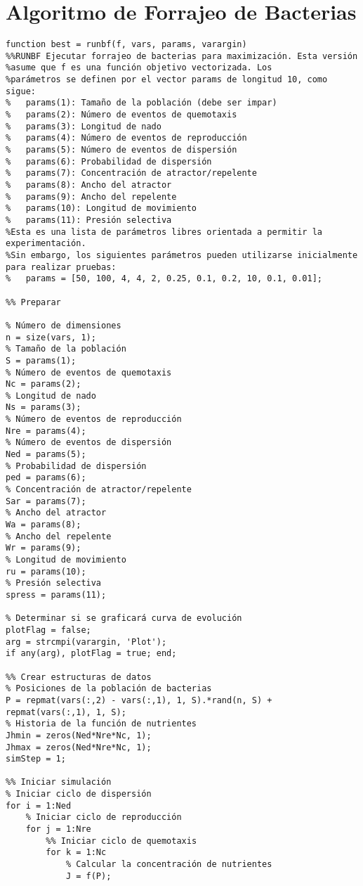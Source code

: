 \section{Algoritmo de Forrajeo de Bacterias}
\begin{scriptsize}
\begin{verbatim}
function best = runbf(f, vars, params, varargin)
%%RUNBF Ejecutar forrajeo de bacterias para maximización. Esta versión 
%asume que f es una función objetivo vectorizada. Los
%parámetros se definen por el vector params de longitud 10, como sigue:
%   params(1): Tamaño de la población (debe ser impar)
%   params(2): Número de eventos de quemotaxis
%   params(3): Longitud de nado
%   params(4): Número de eventos de reproducción
%   params(5): Número de eventos de dispersión
%   params(6): Probabilidad de dispersión
%   params(7): Concentración de atractor/repelente
%   params(8): Ancho del atractor
%   params(9): Ancho del repelente
%   params(10): Longitud de movimiento
%   params(11): Presión selectiva
%Esta es una lista de parámetros libres orientada a permitir la experimentación. 
%Sin embargo, los siguientes parámetros pueden utilizarse inicialmente para realizar pruebas:
%   params = [50, 100, 4, 4, 2, 0.25, 0.1, 0.2, 10, 0.1, 0.01];

%% Preparar

% Número de dimensiones
n = size(vars, 1);
% Tamaño de la población
S = params(1);
% Número de eventos de quemotaxis
Nc = params(2);
% Longitud de nado
Ns = params(3);
% Número de eventos de reproducción
Nre = params(4);
% Número de eventos de dispersión
Ned = params(5);
% Probabilidad de dispersión
ped = params(6);
% Concentración de atractor/repelente
Sar = params(7);
% Ancho del atractor
Wa = params(8);
% Ancho del repelente
Wr = params(9);
% Longitud de movimiento
ru = params(10);
% Presión selectiva
spress = params(11);

% Determinar si se graficará curva de evolución
plotFlag = false;
arg = strcmpi(varargin, 'Plot');
if any(arg), plotFlag = true; end;

%% Crear estructuras de datos
% Posiciones de la población de bacterias
P = repmat(vars(:,2) - vars(:,1), 1, S).*rand(n, S) + repmat(vars(:,1), 1, S);
% Historia de la función de nutrientes
Jhmin = zeros(Ned*Nre*Nc, 1);
Jhmax = zeros(Ned*Nre*Nc, 1);
simStep = 1;

%% Iniciar simulación
% Iniciar ciclo de dispersión
for i = 1:Ned
    % Iniciar ciclo de reproducción
    for j = 1:Nre
        %% Iniciar ciclo de quemotaxis
        for k = 1:Nc
            % Calcular la concentración de nutrientes
            J = f(P);
            

\end{verbatim}
\end{scriptsize}
